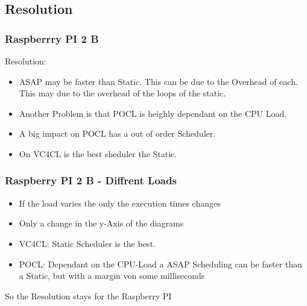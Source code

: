 \documentclass{beamer}
\begin{document}
\subsection{Resolution}
\begin{frame}
	\frametitle{Raspberrry PI 2 B}
	Resolution:
	\begin{itemize}
		\item ASAP may be faster than Static. This can be due to the Overhead of each. This may due to the overhead of the loops of the static.
		\item Another Problem is that POCL is heighly dependant on the CPU Load.
		\item A big impact on POCL has a out of order Scheduler.
		\item On VC4CL is the best sheduler the Static.
	\end{itemize}
\end{frame}
\begin{frame}
	\frametitle{Raspberry PI 2 B - Diffrent Loads}
	\begin{itemize}
		\item If the load varies the only the execution times changes
		\item Only a change in the y-Axis of the diagrams
	\end{itemize}
	\begin{itemize}
		\item VC4CL: Static Scheduler is the best.
		\item POCL: Dependant on the CPU-Load a ASAP Scheduling can be faster than a Static, but with a margin von some milliseconds
	\end{itemize}
	So the Resolution stays for the Raspberry PI
\end{frame}
\end{document}
